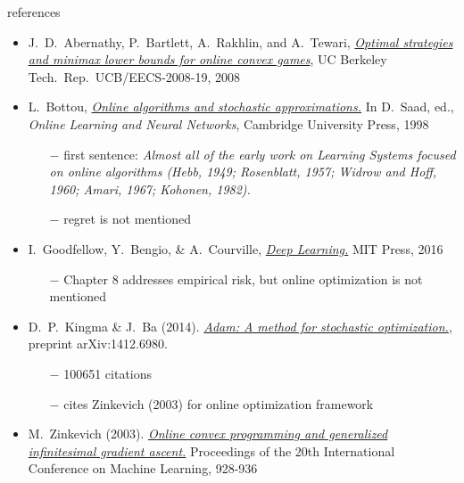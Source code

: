 \documentclass[xcolor={svgnames},
               hyperref={colorlinks,citecolor=DeepPink4,linkcolor=FireBrick,urlcolor=Maroon}]
               {beamer}
\begin{document}
\begin{frame}{references}

\begin{itemize}
\footnotesize
\item J.~D.~Abernathy, P.~Bartlett, A.~Rakhlin, and A.~Tewari, \href{https://www2.eecs.berkeley.edu/Pubs/TechRpts/2008/EECS-2008-19.pdf}{\emph{Optimal strategies and minimax lower bounds for online convex games}}, UC Berkeley Tech.~Rep.~UCB/EECS-2008-19, 2008
\item L.~Bottou, \href{http://leon.bottou.org/papers/bottou-98x}{\emph{Online algorithms and stochastic approximations.}}  In D.~Saad, ed., \emph{Online Learning and Neural Networks}, Cambridge University Press, 1998
    \begin{itemize}
    \scriptsize
    \item[$-$] first sentence: \emph{Almost all of the early work on Learning Systems focused on online algorithms (Hebb, 1949; Rosenblatt, 1957; Widrow and Hoff, 1960; Amari, 1967; Kohonen, 1982).}
    \item[$-$] regret is not mentioned
    \end{itemize}
\item I.~Goodfellow, Y.~Bengio, \& A.~Courville, \href{https://www.deeplearningbook.org/}{\emph{Deep Learning.}} MIT Press, 2016
    \begin{itemize}
    \scriptsize
    \item[$-$] Chapter 8 addresses empirical risk, but online optimization is not mentioned
    \end{itemize}
\item D.~P.~Kingma \& J.~Ba (2014). \href{https://arxiv.org/abs/1412.6980}{\emph{Adam: A method for stochastic optimization.}}, preprint arXiv:1412.6980.
    \begin{itemize}
    \scriptsize
    \item[$-$] 100651 citations
    \item[$-$] cites Zinkevich (2003) for online optimization framework
    \end{itemize}
\item M.~Zinkevich (2003). \href{https://www.aaai.org/Papers/ICML/2003/ICML03-120.pdf}{\emph{Online convex programming and generalized infinitesimal gradient ascent.}} Proceedings of the 20th International Conference on Machine Learning, 928-936
\end{itemize}
\end{frame}
\end{document}
